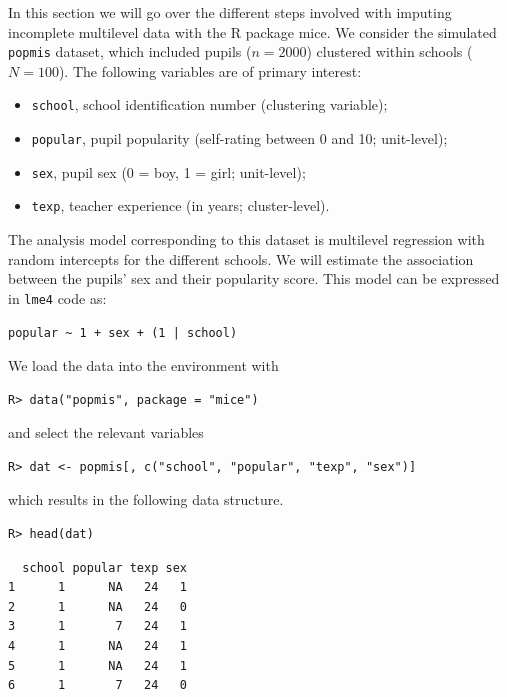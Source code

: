 \documentclass[
  article]{jss}
\providecommand{\tightlist}{%
  \setlength{\itemsep}{0pt}\setlength{\parskip}{0pt}}\usepackage{longtable,booktabs,array}
\begin{document}
In this section we will go over the different steps involved with
imputing incomplete multilevel data with the R package mice. We consider
the simulated \texttt{popmis} dataset, which included pupils
(\(n = 2000\)) clustered within schools (\(N = 100\)). The following
variables are of primary interest:

\begin{itemize}
\tightlist
\item
  \texttt{school}, school identification number (clustering variable);
\item
  \texttt{popular}, pupil popularity (self-rating between 0 and 10;
  unit-level);
\item
  \texttt{sex}, pupil sex (0 = boy, 1 = girl; unit-level);
\item
  \texttt{texp}, teacher experience (in years; cluster-level).
\end{itemize}

The analysis model corresponding to this dataset is multilevel
regression with random intercepts for the different schools. We will
estimate the association between the pupils' sex and their popularity
score. This model can be expressed in \texttt{lme4} code as:

\begin{verbatim}
popular ~ 1 + sex + (1 | school)
\end{verbatim}

We load the data into the environment with

\begin{verbatim}
R> data("popmis", package = "mice")
\end{verbatim}

and select the relevant variables

\begin{verbatim}
R> dat <- popmis[, c("school", "popular", "texp", "sex")] 
\end{verbatim}

which results in the following data structure.

\begin{verbatim}
R> head(dat)
\end{verbatim}

\begin{verbatim}
  school popular texp sex
1      1      NA   24   1
2      1      NA   24   0
3      1       7   24   1
4      1      NA   24   1
5      1      NA   24   1
6      1       7   24   0
\end{verbatim}
\end{document}
